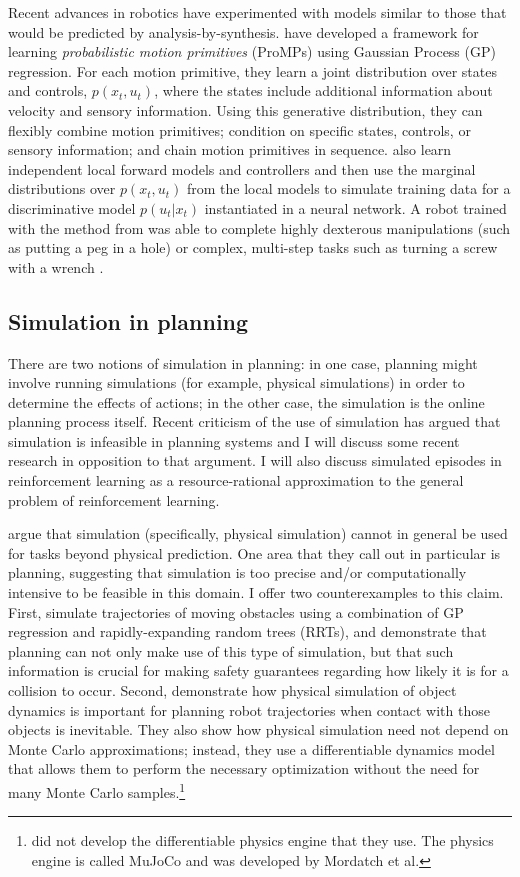 \documentclass[12pt]{article}
\begin{document}
Recent advances in robotics have experimented with models similar to those that would be predicted by analysis-by-synthesis. \cite{Paraschos2015} have developed a framework for learning \textit{probabilistic motion primitives} (ProMPs) using Gaussian Process (GP) regression. For each motion primitive, they learn a joint distribution over states and controls, $p(x_t, u_t)$, where the states include additional information about velocity and sensory information. Using this generative distribution, they can flexibly combine motion primitives; condition on specific states, controls, or sensory information; and chain motion primitives in sequence. \cite{Levine2015} also learn independent local forward models and controllers and then use the marginal distributions over $p(x_t,u_t)$ from the local models to simulate training data for a discriminative model $p(u_t|x_t)$ instantiated in a neural network. A robot trained with the method from \cite{Levine2015} was able to complete highly dexterous manipulations (such as putting a peg in a hole) or complex, multi-step tasks such as turning a screw with a wrench \citep{Han2015}.

\subsection*{Simulation in planning}

There are two notions of simulation in planning: in one case, planning might involve running simulations (for example, physical simulations) in order to determine the effects of actions; in the other case, the simulation is the online planning process itself. Recent criticism of the use of simulation has argued that simulation is infeasible in planning systems \citep{Davis,Davis2014} and I will discuss some recent research in opposition to that argument. I will also discuss simulated episodes in reinforcement learning as a resource-rational approximation to the general problem of reinforcement learning.

\cite{Davis,Davis2014} argue that simulation (specifically, physical simulation) cannot in general be used for tasks beyond physical prediction. One area that they call out in particular is planning, suggesting that simulation is too precise and/or computationally intensive to be feasible in this domain. I offer two counterexamples to this claim. First, \cite{Aoude2013} simulate trajectories of moving obstacles using a combination of GP regression and rapidly-expanding random trees (RRTs), and demonstrate that planning can not only make use of this type of simulation, but that such information is crucial for making safety guarantees regarding how likely it is for a collision to occur. Second, \cite{Kitaev2015} demonstrate how physical simulation of object dynamics is important for planning robot trajectories when contact with those objects is inevitable. They also show how physical simulation need not depend on Monte Carlo approximations; instead, they use a differentiable dynamics model that allows them to perform the necessary optimization without the need for many Monte Carlo samples.\footnote{\cite{Kitaev2015} did not develop the differentiable physics engine that they use. The physics engine is called MuJoCo and was developed by Mordatch et al.}
\end{document}
